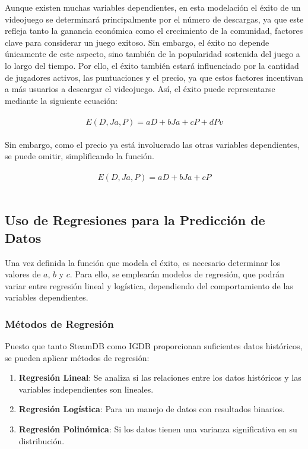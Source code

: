 \documentclass[titlepage,a4paper]{article}
\begin{document}
Aunque existen muchas variables dependientes, en esta modelación el éxito de un videojuego se determinará principalmente por el número de descargas, ya que este refleja tanto la ganancia económica como el crecimiento de la comunidad, factores clave para considerar un juego exitoso. Sin embargo, el éxito no depende únicamente de este aspecto, sino también de la popularidad sostenida del juego a lo largo del tiempo. Por ello, el éxito también estará influenciado por la cantidad de jugadores activos, las puntuaciones y el precio, ya que estos factores incentivan a más usuarios a descargar el videojuego. Así, el éxito puede representarse mediante la siguiente ecuación: \\ \\ 

 \[E(D, Ja, P) = aD + bJa + cP + dPv\]\\

Sin embargo, como el precio ya está involucrado las otras variables dependientes, se puede omitir, simplificando la función. \\\\

\begin{equation}
    E(D, Ja, P) = aD + bJa + cP
\end{equation} \\



\subsection{Uso de Regresiones para la Predicción de Datos}
Una vez definida la función que modela el éxito, es necesario determinar los valores de $a$, $b$ y $c$. Para ello, se emplearán modelos de regresión, que podrán variar entre regresión lineal y logística, dependiendo del comportamiento de las variables dependientes.


\subsubsection{Métodos de Regresión}
Puesto que tanto SteamDB como IGDB proporcionan suficientes datos históricos, se pueden aplicar métodos de regresión: \\

\begin{enumerate}

    \item \textbf{Regresión Lineal}: Se analiza si las relaciones entre los datos históricos y las variables independientes son lineales. \\
    
    \item \textbf{Regresión Logística}: Para un manejo de datos con resultados binarios. \\
    
    \item \textbf{Regresión Polinómica}: Si los datos tienen una varianza significativa en su distribución. \\
    
\end{enumerate}
\end{document}
